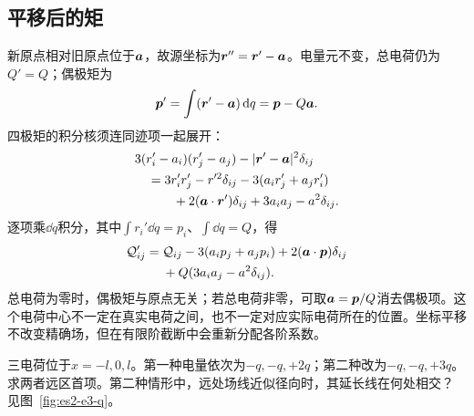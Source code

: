 \subsection{平移后的矩}
新原点相对旧原点位于$\bm{a}$，故源坐标为$\bm{r}''=\bm{r}'-\bm{a}$。电量元不变，总电荷仍为$Q'=Q$；偶极矩为
\[\bm{p}'=\int(\bm{r}'-\bm{a})\mathop{}\!\mathrm d q
=\bm{p}-Q\bm{a}.\]
四极矩的积分核须连同迹项一起展开：
\[\begin{aligned}
&3(r_i'-a_i)(r_j'-a_j)-|\bm{r}'-\bm{a}|^2\delta_{ij}\\
&\quad=3r_i'r_j'-r'^2\delta_{ij}
-3(a_ir_j'+a_jr_i')\\
&\qquad\quad+2(\bm{a}\cdot\bm{r}')\delta_{ij}
+3a_ia_j-a^2\delta_{ij}.
\end{aligned}\]
逐项乘$\dd q$积分，其中$\int r_i'\dd q=p_i$、$\int\dd q=Q$，得
\[\begin{split}\mathcal Q'_{ij}={}&\mathcal Q_{ij}-3(a_ip_j+a_jp_i)
+2(\bm{a}\cdot\bm{p})\delta_{ij}\\
&+Q(3a_ia_j-a^2\delta_{ij}).\end{split}\]
总电荷为零时，偶极矩与原点无关；若总电荷非零，可取$\bm{a}=\bm{p}/Q$消去偶极项。这个电荷中心不一定在真实电荷之间，也不一定对应实际电荷所在的位置。坐标平移不改变精确场，但在有限阶截断中会重新分配各阶系数。

\begin{example}[三电荷的偶极与电荷中心]\label{ex:es2-e3}
三电荷位于$x=-l,0,l$。第一种电量依次为$-q,-q,+2q$；第二种改为$-q,-q,+3q$。求两者远区首项。第二种情形中，远处场线近似径向时，其延长线在何处相交？ 见图~\ref{fig:es2-e3-q}。
\end{example}


